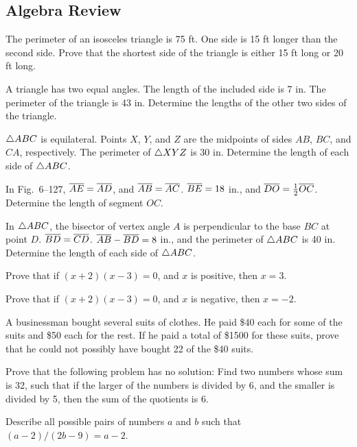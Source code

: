 \documentclass[11pt]{book}
\begin{document}
\subsection*{Algebra Review}
\begin{exlist}
\item The perimeter of an isosceles triangle is 75 ft. One side is 15 ft longer
  than the second side. Prove that the shortest side of the triangle is either
  15 ft long or 20 ft long.
\item A triangle has two equal angles. The length of the included side is 7 in.
  The perimeter of the triangle is 43 in. Determine the lengths of the other
  two sides of the triangle.
\item $\triangle ABC$ is equilateral. Points $X$, $Y$, and $Z$ are the midpoints of
  sides $AB$, $BC$, and $CA$, respectively. The perimeter of $\triangle XYZ$ is
  30 in. Determine the length of each side of $\triangle ABC$.
\item In Fig.~6--127, $\overline{AE} = \overline{AD}$, and $\overline{AB} = \overline{AC}$. $\overline{BE} =
  18$ in., and $\overline{DO} = \tfrac{1}{2}\overline{OC}$. Determine the length of segment
  $OC$.
\exfig{\FIGVIONEHUNDREDTWENTYSEVEN}
\item In $\triangle ABC$, the bisector of vertex angle $A$ is perpendicular to the
  base $BC$ at point $D$. $\overline{BD} = \overline{CD}$. $\overline{AB} - \overline{BD} = 8$ in., and
  the perimeter of $\triangle ABC$ is 40 in. Determine the length of each side of
  $\triangle ABC$.
\item Prove that if $(x + 2)(x - 3) = 0$, and $x$ is positive, then $x = 3$.
\item Prove that if $(x + 2)(x - 3) = 0$, and $x$ is negative, then $x = -2$.
\item A businessman bought several suits of clothes. He paid \$40 each for some
  of the suits and \$50 each for the rest. If he paid a total of \$1500 for
  these suits, prove that he could not possibly have bought 22 of the \$40
  suits.
\item[\stex 9.] Prove that the following problem has no solution: Find two
  numbers whose sum is 32, such that if the larger of the numbers is divided by
  6, and the smaller is divided by 5, then the sum of the quotients is 6.
\item[\stex 10.] Describe all possible pairs of numbers $a$ and $b$ such that
  $(a - 2)/(2b - 9) = a - 2$.
\end{exlist}
\end{document}
